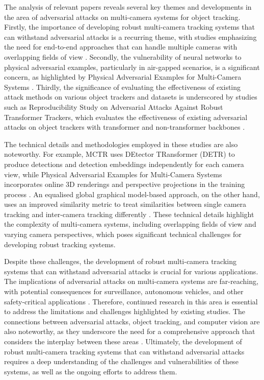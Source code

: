 \documentclass[conference]{IEEEtran}
\begin{document}
The analysis of relevant papers reveals several key themes and developments in the area of adversarial attacks on multi-camera systems for object tracking. Firstly, the importance of developing robust multi-camera tracking systems that can withstand adversarial attacks is a recurring theme, with studies emphasizing the need for end-to-end approaches that can handle multiple cameras with overlapping fields of view \cite{MCTR}. Secondly, the vulnerability of neural networks to physical adversarial examples, particularly in air-gapped scenarios, is a significant concern, as highlighted by Physical Adversarial Examples for Multi-Camera Systems \cite{Physical Adversarial Examples for Multi-Camera Systems}. Thirdly, the significance of evaluating the effectiveness of existing attack methods on various object trackers and datasets is underscored by studies such as Reproducibility Study on Adversarial Attacks Against Robust Transformer Trackers, which evaluates the effectiveness of existing adversarial attacks on object trackers with transformer and non-transformer backbones \cite{Reproducibility Study on Adversarial Attacks Against Robust Transformer Trackers}.

The technical details and methodologies employed in these studies are also noteworthy. For example, MCTR uses DEtector TRansformer (DETR) to produce detections and detection embeddings independently for each camera view, while Physical Adversarial Examples for Multi-Camera Systems incorporates online 3D renderings and perspective projections in the training process \cite{MCTR}. An equalised global graphical model-based approach, on the other hand, uses an improved similarity metric to treat similarities between single camera tracking and inter-camera tracking differently \cite{An equalised global graphical model-based approach}. These technical details highlight the complexity of multi-camera systems, including overlapping fields of view and varying camera perspectives, which poses significant technical challenges for developing robust tracking systems.

Despite these challenges, the development of robust multi-camera tracking systems that can withstand adversarial attacks is crucial for various applications. The implications of adversarial attacks on multi-camera systems are far-reaching, with potential consequences for surveillance, autonomous vehicles, and other safety-critical applications \cite{Reproducibility Study on Adversarial Attacks Against Robust Transformer Trackers}. Therefore, continued research in this area is essential to address the limitations and challenges highlighted by existing studies. The connections between adversarial attacks, object tracking, and computer vision are also noteworthy, as they underscore the need for a comprehensive approach that considers the interplay between these areas \cite{Physical Adversarial Examples for Multi-Camera Systems}. Ultimately, the development of robust multi-camera tracking systems that can withstand adversarial attacks requires a deep understanding of the challenges and vulnerabilities of these systems, as well as the ongoing efforts to address them.
\end{document}
